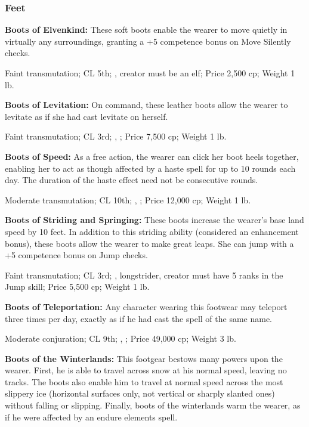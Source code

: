 \subsubsection{Feet}

\textbf{Boots of Elvenkind:} These soft boots enable the wearer to move quietly in virtually any surroundings, granting a +5 competence bonus on Move Silently checks.

Faint transmutation; CL 5th; , creator must be an elf; Price 2,500 cp; Weight 1 lb.

\textbf{Boots of Levitation:} On command, these leather boots allow the wearer to levitate as if she had cast levitate on herself.

Faint transmutation; CL 3rd; , ; Price 7,500 cp; Weight 1 lb.

\textbf{Boots of Speed:} As a free action, the wearer can click her boot heels together, enabling her to act as though affected by a haste spell for up to 10 rounds each day. The duration of the haste effect need not be consecutive rounds.

Moderate transmutation; CL 10th; , ; Price 12,000 cp; Weight 1 lb.

\textbf{Boots of Striding and Springing:} These boots increase the wearer's base land speed by 10 feet. In addition to this striding ability (considered an enhancement bonus), these boots allow the wearer to make great leaps. She can jump with a +5 competence bonus on Jump checks.

Faint transmutation; CL 3rd; , longstrider, creator must have 5 ranks in the Jump skill; Price 5,500 cp; Weight 1 lb.

\textbf{Boots of Teleportation:} Any character wearing this footwear may teleport three times per day, exactly as if he had cast the spell of the same name.

Moderate conjuration; CL 9th; , ; Price 49,000 cp; Weight 3 lb.

\textbf{Boots of the Winterlands:} This footgear bestows many powers upon the wearer. First, he is able to travel across snow at his normal speed, leaving no tracks. The boots also enable him to travel at normal speed across the most slippery ice (horizontal surfaces only, not vertical or sharply slanted ones) without falling or slipping. Finally, boots of the winterlands warm the wearer, as if he were affected by an endure elements spell.

